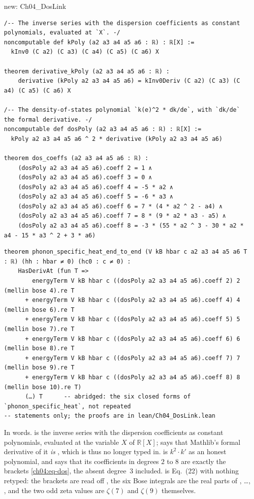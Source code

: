 \begin{leanbox}{new: Ch04\_DosLink}
\begin{lstlisting}[style=lean,basicstyle=\ttfamily\footnotesize]
/-- The inverse series with the dispersion coefficients as constant polynomials, evaluated at `X`. -/
noncomputable def kPoly (a2 a3 a4 a5 a6 : ℝ) : ℝ[X] :=
  kInv0 (C a2) (C a3) (C a4) (C a5) (C a6) X

theorem derivative_kPoly (a2 a3 a4 a5 a6 : ℝ) :
    derivative (kPoly a2 a3 a4 a5 a6) = kInv0Deriv (C a2) (C a3) (C a4) (C a5) (C a6) X

/-- The density-of-states polynomial `k(e)^2 * dk/de`, with `dk/de` the formal derivative. -/
noncomputable def dosPoly (a2 a3 a4 a5 a6 : ℝ) : ℝ[X] :=
  kPoly a2 a3 a4 a5 a6 ^ 2 * derivative (kPoly a2 a3 a4 a5 a6)

theorem dos_coeffs (a2 a3 a4 a5 a6 : ℝ) :
    (dosPoly a2 a3 a4 a5 a6).coeff 2 = 1 ∧
    (dosPoly a2 a3 a4 a5 a6).coeff 3 = 0 ∧
    (dosPoly a2 a3 a4 a5 a6).coeff 4 = -5 * a2 ∧
    (dosPoly a2 a3 a4 a5 a6).coeff 5 = -6 * a3 ∧
    (dosPoly a2 a3 a4 a5 a6).coeff 6 = 7 * (4 * a2 ^ 2 - a4) ∧
    (dosPoly a2 a3 a4 a5 a6).coeff 7 = 8 * (9 * a2 * a3 - a5) ∧
    (dosPoly a2 a3 a4 a5 a6).coeff 8 = -3 * (55 * a2 ^ 3 - 30 * a2 * a4 - 15 * a3 ^ 2 + 3 * a6)
\end{lstlisting}
\begin{lstlisting}[style=lean,basicstyle=\ttfamily\fontsize{7.2}{8.6}\selectfont]
theorem phonon_specific_heat_end_to_end (V kB hbar c a2 a3 a4 a5 a6 T : ℝ) (hh : hbar ≠ 0) (hc0 : c ≠ 0) :
    HasDerivAt (fun T =>
        energyTerm V kB hbar c ((dosPoly a2 a3 a4 a5 a6).coeff 2) 2 (mellin bose 4).re T
      + energyTerm V kB hbar c ((dosPoly a2 a3 a4 a5 a6).coeff 4) 4 (mellin bose 6).re T
      + energyTerm V kB hbar c ((dosPoly a2 a3 a4 a5 a6).coeff 5) 5 (mellin bose 7).re T
      + energyTerm V kB hbar c ((dosPoly a2 a3 a4 a5 a6).coeff 6) 6 (mellin bose 8).re T
      + energyTerm V kB hbar c ((dosPoly a2 a3 a4 a5 a6).coeff 7) 7 (mellin bose 9).re T
      + energyTerm V kB hbar c ((dosPoly a2 a3 a4 a5 a6).coeff 8) 8 (mellin bose 10).re T)
      (…) T      -- abridged: the six closed forms of `phonon_specific_heat`, not repeated
-- statements only; the proofs are in lean/Ch04_DosLink.lean
\end{lstlisting}
\end{leanbox}

\noindent In words.
 is the inverse series  with the dispersion coefficients as constant polynomials, evaluated at the variable $X$ of $\mathbb R[X]$;  says that Mathlib's formal derivative of it \emph{is} , which is thus no longer typed in.
 is $k^2\cdot k'$ as an honest polynomial, and  says that its coefficients in degrees $2$ to $8$ are exactly the brackets \eqref{ch04:eq-dos}, the absent degree~$3$ included.
 is Eq.~(22) with nothing retyped: the brackets are read off , the six Bose integrals are the real parts of , \dots, , and the two odd zeta values are $\zeta(7)$ and $\zeta(9)$ themselves.

